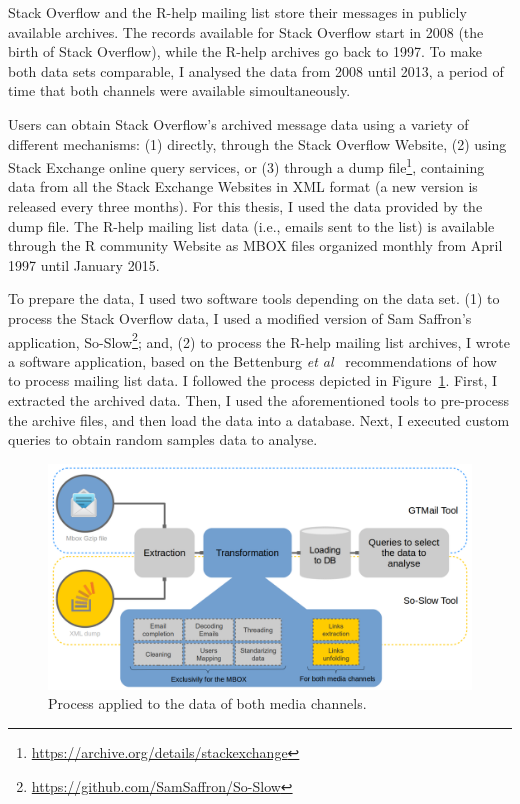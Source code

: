 \documentclass{sig-alternate-05-2015}
\begin{document}
	Stack Overflow and the R-help mailing list store their messages in publicly available archives.
	The records available for Stack Overflow start in 2008 (the birth of Stack Overflow), while the R-help archives go back to 1997.
	To make both data sets comparable, I analysed the data from 2008 until 2013, a period of time that both channels were available simoultaneously.

	Users can obtain Stack Overflow's archived message data using a variety of different mechanisms:
	(1) directly, through the Stack Overflow Website,
	(2) using Stack Exchange online query services, or
	(3) through a dump file\footnote{\url{https://archive.org/details/stackexchange}}, containing data from all the Stack Exchange Websites in XML format (a new version is released every three months).
	For this thesis, I used the data provided by the dump file.
	The R-help mailing list data (i.e., emails sent to the list) is available through the R community Website as MBOX files organized monthly from April 1997 until January 2015.

	To prepare the data, I used two software tools depending on the data set.
	(1) to process the Stack Overflow data, I used a modified version of Sam Saffron's application, So-Slow\footnote{\url{https://github.com/SamSaffron/So-Slow}}; and,
	(2) to process the R-help mailing list archives, I wrote a software application, based on the Bettenburg \textit{et al}~\cite{Bettenburg2009} recommendations of how to process mailing list data.
	I followed the process depicted in Figure~\ref{fig:data_extraction}.
	First, I extracted the archived data.
	Then, I used the aforementioned tools to pre-process the archive files, and then load the data into a database. 
	Next, I executed custom queries to obtain random samples data to analyse.

	\begin{figure}[!htb]
		\centering
		\includegraphics[width=\columnwidth]{Figures/data_extraction}
		\caption[Data process]{Process applied to the data of both media channels.}
		\label{fig:data_extraction}
	\end{figure}
\end{document}
